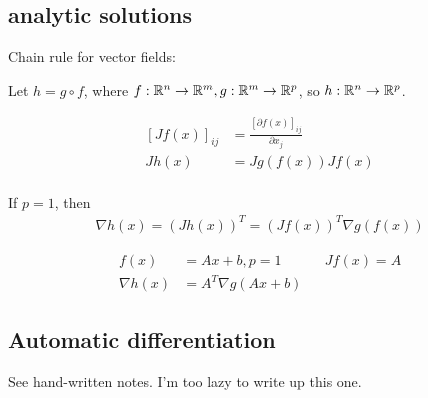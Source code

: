 \documentclass[class=article,crop=false]{standalone}
\begin{document}
\subsection{analytic solutions}
Chain rule for vector fields:

Let $ h = g \circ f$, where  $ f: \mathbb{R}^{n} \to \mathbb{R}^{m}, g: \mathbb{R}^{m} \to \mathbb{R}^{p}$, so $ h: \mathbb{R}^{n} \to \mathbb{R}^{p}$.

\begin{align*}
	\left[ Jf(x) \right]_{ij} &= \frac{[\partial f(x)]_{ij}}{ \partial x_j} \\
	Jh(x) &= Jg(f(x)) Jf(x)\\
\end{align*}
\begin{eg}
If $ p=1$, then
 \begin{align*}
	 \nabla h(x) = (Jh(x))^{T} = (Jf(x))^{T} \nabla g(f(x))
\end{align*}
\end{eg}
\begin{eg}
\begin{align*}
	f(x) &= Ax+b, p =1&& Jf(x) = A\\
	\nabla h(x) &= A^{T} \nabla g(Ax+b)
\end{align*}
\end{eg}

\subsection{Automatic differentiation}
See hand-written notes. I'm too lazy to write up this one.
\end{document}
